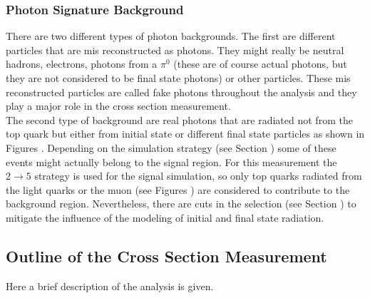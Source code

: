 \subsubsection{Photon Signature Background}


There are two different types of photon backgrounds. The first are different particles that are mis reconstructed as photons. They might really be neutral hadrons, electrons, photons from a $\pi^0$ (these are of course actual photons, but they are not considered to be final state photons) or other particles. These mis reconstructed particles are called fake photons throughout the analysis and they play a major role in the cross section measurement. \\
The second type of background are real photons that are radiated not from the top quark but either from initial state or different final state particles as shown in Figures . Depending on the simulation strategy (see Section ) some of these events might actually belong to the signal region. For this measurement the $2 \to 5$ strategy is used for the signal simulation, so only top quarks radiated from the light quarks or the muon (see Figures ) are considered to contribute to the background region. Nevertheless, there are cuts in the selection (see Section ) to mitigate the influence of the modeling of initial and final state radiation.

\subsection{Outline of the \ttgamma Cross Section Measurement}

Here a brief description of the analysis is given.\\


